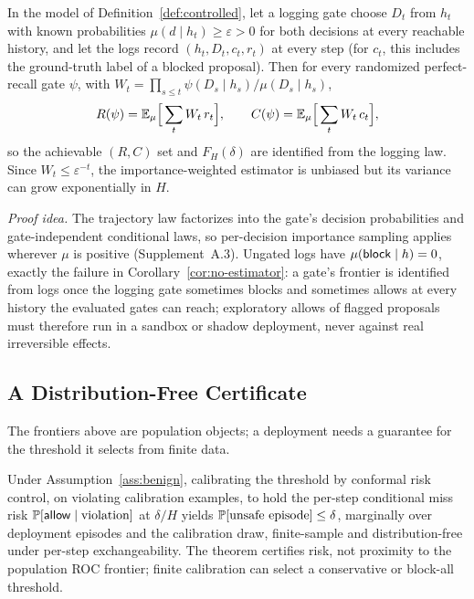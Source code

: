 \begin{proposition}\label{prop:explore}
In the model of Definition~\ref{def:controlled}, let a logging gate choose $D_t$ from $h_t$ with
known probabilities $\mu(d\mid h_t)\ge\varepsilon>0$ for both decisions at every reachable
history, and let the logs record $(h_t,D_t,c_t,r_t)$ at every step (for $c_t$, this includes the
ground-truth label of a blocked proposal). Then for every randomized perfect-recall gate $\psi$,
with $W_t=\prod_{s\le t}\psi(D_s\mid h_s)/\mu(D_s\mid h_s)$,
\[
  R(\psi)=\mathbb{E}_\mu\Big[\sum_{t}W_t\,r_t\Big],\qquad C(\psi)=\mathbb{E}_\mu\Big[\sum_{t}W_t\,c_t\Big],
\]
so the achievable $(R,C)$ set and $F_H(\delta)$ are identified from the logging law. Since
$W_t\le\varepsilon^{-t}$, the importance-weighted estimator is unbiased but its variance can grow
exponentially in $H$.
\end{proposition}

\noindent\emph{Proof idea.} The trajectory law factorizes into the gate's decision
probabilities and gate-independent conditional laws, so per-decision importance sampling
\citep{precup2000eligibility} applies wherever $\mu$ is positive (Supplement~A.3). Ungated logs
have $\mu(\mathsf{block}\mid h)=0$, exactly the failure in Corollary~\ref{cor:no-estimator}: a gate's
frontier is identified from logs once the logging gate sometimes blocks and sometimes allows at
every history the evaluated gates can reach; exploratory allows of flagged proposals must therefore run
in a sandbox or shadow deployment, never against real irreversible effects.

\subsection{A Distribution-Free Certificate}\label{t2:certificate}

The frontiers above are population objects; a deployment needs a guarantee
for the threshold it selects from finite data.

\begin{theorem}\label{thm:conformal}
Under Assumption~\ref{ass:benign}, calibrating the threshold by conformal risk
control, on violating calibration examples, to hold the per-step conditional miss
risk $\mathbb{P}[\mathsf{allow}\mid\text{violation}]$ at $\delta/H$ yields
$\mathbb{P}[\text{unsafe episode}]\le\delta$, marginally over deployment episodes and the
calibration draw, finite-sample and distribution-free under per-step
exchangeability. The theorem certifies risk, not proximity to the population ROC
frontier; finite calibration can select a conservative or block-all threshold.
\end{theorem}

